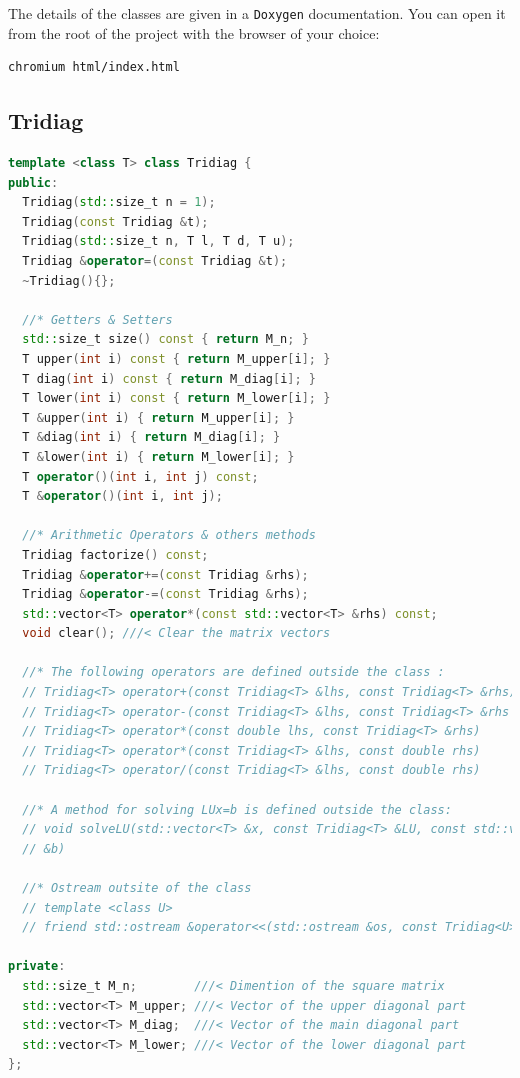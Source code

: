 \documentclass{article}
\begin{document}
The details of the classes are given in a \texttt{Doxygen} documentation.  
You can open it from the root of the project with the browser of your choice:
\begin{lstlisting}[language=bash]
chromium html/index.html
\end{lstlisting}

\subsection{Tridiag}

\begin{lstlisting}[language=c++]
template <class T> class Tridiag {
public:
  Tridiag(std::size_t n = 1);
  Tridiag(const Tridiag &t);
  Tridiag(std::size_t n, T l, T d, T u);
  Tridiag &operator=(const Tridiag &t);
  ~Tridiag(){};

  //* Getters & Setters
  std::size_t size() const { return M_n; }
  T upper(int i) const { return M_upper[i]; }
  T diag(int i) const { return M_diag[i]; }
  T lower(int i) const { return M_lower[i]; }
  T &upper(int i) { return M_upper[i]; }
  T &diag(int i) { return M_diag[i]; }
  T &lower(int i) { return M_lower[i]; }
  T operator()(int i, int j) const;
  T &operator()(int i, int j);

  //* Arithmetic Operators & others methods
  Tridiag factorize() const;
  Tridiag &operator+=(const Tridiag &rhs);
  Tridiag &operator-=(const Tridiag &rhs);
  std::vector<T> operator*(const std::vector<T> &rhs) const;
  void clear(); ///< Clear the matrix vectors
  
  //* The following operators are defined outside the class :
  // Tridiag<T> operator+(const Tridiag<T> &lhs, const Tridiag<T> &rhs)
  // Tridiag<T> operator-(const Tridiag<T> &lhs, const Tridiag<T> &rhs
  // Tridiag<T> operator*(const double lhs, const Tridiag<T> &rhs)
  // Tridiag<T> operator*(const Tridiag<T> &lhs, const double rhs)
  // Tridiag<T> operator/(const Tridiag<T> &lhs, const double rhs)
  
  //* A method for solving LUx=b is defined outside the class:
  // void solveLU(std::vector<T> &x, const Tridiag<T> &LU, const std::vector<T>
  // &b)

  //* Ostream outsite of the class
  // template <class U>
  // friend std::ostream &operator<<(std::ostream &os, const Tridiag<U> &t);

private:
  std::size_t M_n;        ///< Dimention of the square matrix
  std::vector<T> M_upper; ///< Vector of the upper diagonal part
  std::vector<T> M_diag;  ///< Vector of the main diagonal part
  std::vector<T> M_lower; ///< Vector of the lower diagonal part
};
\end{lstlisting}
\end{document}
